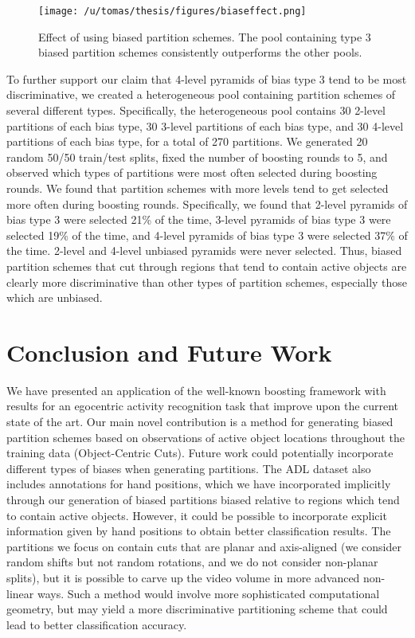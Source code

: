 \documentclass{bmvc2k}
\begin{document}
  \begin{figure}[t]
		\begin{center}
			  \texttt{[image: /u/tomas/thesis/figures/biaseffect.png]}
		\end{center}
		   \caption{Effect of using biased partition schemes. The pool
       containing type 3 biased partition schemes consistently outperforms
     the other pools.}
				\label{fig:long}
				\label{fig:onecol}
	\end{figure}
  
  To further support our claim that 4-level pyramids of bias type 3 tend to be most
  discriminative, we created a heterogeneous pool containing partition
  schemes of
  several different types. Specifically, the heterogeneous pool contains 30 2-level
  partitions of each bias type, 30 3-level partitions of each bias type, and
  30 4-level partitions of each bias type, for a total of 270 partitions.
  We generated 20 random 50/50 train/test splits, fixed the number of
  boosting rounds to 5, and observed which types of partitions were most
  often selected during boosting rounds.
  We found that partition schemes with more levels tend to get selected more
  often during boosting rounds.
  Specifically, we found that 2-level pyramids of bias type 3 were selected
  21\% of the time, 3-level pyramids of bias type 3 were selected 19\% of
  the time, and 4-level pyramids of bias type 3 were selected 37\% of the
  time. 2-level and 4-level unbiased pyramids were never selected. Thus,
  biased partition schemes that cut through regions that tend to contain
  active objects are clearly more discriminative than other types of
  partition schemes, especially those which are unbiased.
	
\section{Conclusion and Future Work}
	We have presented an application of the well-known boosting framework
	with results for an
  egocentric activity recognition task that improve upon the current state of
  the art.
	Our main novel contribution is a method for generating biased partition
	schemes based on observations of active object locations throughout the
  training data (Object-Centric Cuts).
	Future work could potentially incorporate different types of biases when generating
	partitions. The ADL dataset also includes annotations for hand positions,
	which we have incorporated implicitly through our generation of biased partitions
	biased relative to regions which tend to contain active objects. However,
	it could be possible to incorporate explicit information given by hand
	positions to obtain better classification results.
	The partitions we focus on contain cuts that are
  planar and axis-aligned (we consider random shifts but not random
  rotations, and we do not consider non-planar splits),
  but it is possible to carve up the
	video volume in more advanced non-linear ways. Such a method would involve more
	sophisticated computational geometry, but may yield a more discriminative
	partitioning scheme that could lead to better classification accuracy.

\end{document}
